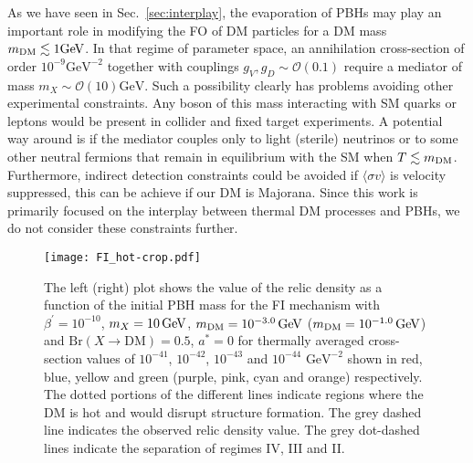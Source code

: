 \documentclass[aps,prd,reprint,twocolumn,preprintnumbers,floatfix,nofootinbib]{revtex4-1}
\newcommand{\mDM}{m_{\rm DM}}
\begin{document}
As we have seen in Sec.~\ref{sec:interplay}, the evaporation of PBHs may play an important role in modifying the FO of DM particles for a DM mass $\mDM\lesssim 1 \mathrm{GeV}$. In that regime of parameter space, an annihilation cross-section of order $10^{-9}\mathrm{GeV}^{-2}$ together with couplings $g_V,g_D \sim \mathcal O(0.1)$ require a mediator of mass $m_X\sim \mathcal O(10)\mathrm{GeV}$. Such a possibility clearly has problems avoiding other experimental constraints. Any boson of this mass interacting with SM quarks or leptons would be present in collider and fixed target experiments. A potential way around is if the mediator couples only to light (sterile) neutrinos or to some other neutral fermions that remain in equilibrium with the SM when $T\lesssim \mDM$. Furthermore, indirect detection constraints could be avoided if $\langle \sigma v\rangle$ is velocity suppressed, this can be achieve if our DM is Majorana. Since this work is primarily focused on the interplay between thermal DM processes and PBHs, we do not consider these constraints further.

\begin{figure*}[t!]
\centering
 \texttt{[image: FI\_hot-crop.pdf]}
 \caption{\label{fig:FI_dilute1} The left (right) plot shows the value of the relic density as a function of the initial 
 PBH mass for the FI mechanism with $\beta^\prime = 10^{-10}$, 
$m_X = 10\,\rm{GeV}$, $\mDM = 10^{-3.0}\, \rm{GeV}$ ($\mDM = 10^{-1.0}\, \rm{GeV}$) and $\mathrm{Br}(X\to \mathrm{DM}) = 0.5$, $a^{*}=0$ for
thermally averaged cross-section values of $10^{-41}$, $10^{-42}$, $10^{-43}$ and $10^{-44}$ $\text{GeV}^{-2}$ shown in red, blue, yellow and green (purple, pink, cyan and orange) respectively. {The dotted portions of the different lines indicate regions where the DM is hot and would disrupt structure formation.} The grey dashed line indicates the observed relic density value. The grey dot-dashed lines indicate the separation of regimes IV, III and II.}
\end{figure*}
\end{document}
